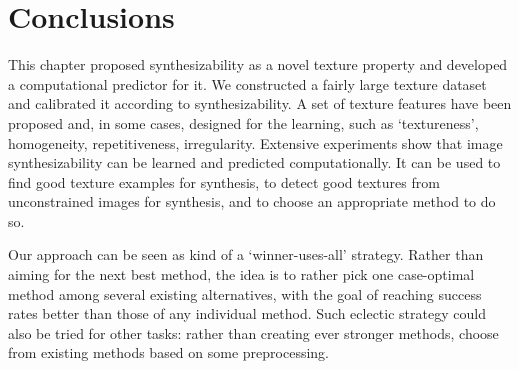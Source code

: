 

\section{Conclusions}
\label{te:sec:conclusion}
This chapter proposed synthesizability as a novel texture property and
developed a computational predictor for it. We constructed a fairly
large texture dataset and calibrated it according to
synthesizability. A set of texture features have been proposed and, in
some cases, designed for the learning, such as `textureness',
homogeneity, repetitiveness, irregularity. Extensive experiments show
that image synthesizability can be learned and predicted
computationally. It can be used to find good texture examples for
synthesis, to detect good textures from unconstrained images for
synthesis, and to choose an appropriate method to do so.

Our approach can be seen as kind of a `winner-uses-all' strategy. 
Rather than aiming for the next best method, the idea is to rather 
pick one case-optimal method among several existing alternatives,
with the goal of reaching success rates better than those of any 
individual method. Such eclectic strategy could also be tried for 
other tasks: rather than creating ever stronger methods, choose 
from existing methods based on some preprocessing. 

